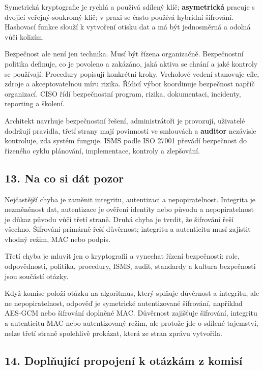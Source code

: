 \documentclass[11pt,a4paper]{article}
\begin{document}
Symetrická kryptografie je rychlá a používá sdílený klíč; \textbf{asymetrická} pracuje s dvojicí veřejný-soukromý klíč; v praxi se často používá hybridní šifrování. Hashovací funkce slouží k vytvoření otisku dat a má být jednosměrná a odolná vůči kolizím.

Bezpečnost ale není jen technika. Musí být řízena organizačně. Bezpečnostní politika definuje, co je povoleno a zakázáno, jaká aktiva se chrání a jaké kontroly se používají. Procedury popisují konkrétní kroky. Vrcholové vedení stanovuje cíle, zdroje a akceptovatelnou míru rizika. Řídicí výbor koordinuje bezpečnost napříč organizací. CISO řídí bezpečnostní program, rizika, dokumentaci, incidenty, reporting a školení.

Architekt navrhuje bezpečnostní řešení, administrátoři je provozují, uživatelé dodržují pravidla, třetí strany mají povinnosti ve smlouvách a \textbf{auditor} nezávisle kontroluje, zda systém funguje. ISMS podle ISO 27001 převádí bezpečnost do řízeného cyklu plánování, implementace, kontroly a zlepšování.

\subsection*{13. Na co si dát pozor}

Nejčastější chyba je zaměnit integritu, autentizaci a nepopiratelnost. Integrita je nezměněnost dat, autentizace je ověření identity nebo původu a nepopiratelnost je důkaz původu vůči třetí straně. Druhá chyba je tvrdit, že šifrování řeší všechno. Šifrování primárně řeší důvěrnost; integritu a autenticitu musí zajistit vhodný režim, MAC nebo podpis.

Třetí chyba je mluvit jen o kryptografii a vynechat řízení bezpečnosti: role, odpovědnosti, politika, procedury, ISMS, audit, standardy a kultura bezpečnosti jsou součástí otázky.

Když komise položí otázku na algoritmus, který splňuje důvěrnost a integritu, ale ne nepopiratelnost, odpověď je symetrické autentizované šifrování, například AES-GCM nebo šifrování doplněné MAC. Důvěrnost zajišťuje šifrování, integritu a autenticitu MAC nebo autentizovaný režim, ale protože jde o sdílené tajemství, nelze třetí straně spolehlivě prokázat, která ze stran zprávu vytvořila.

\subsection*{14. Doplňující propojení k otázkám z komisí}
\end{document}
